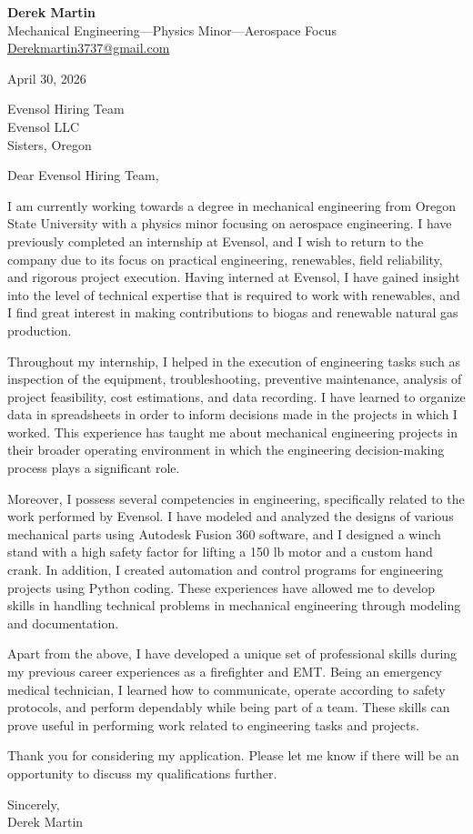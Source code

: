 \documentclass[11pt]{article}
\begin{document}
{\Large \textbf{Derek Martin}}\\
Mechanical Engineering---Physics Minor---Aerospace Focus\\
\href{mailto:Derekmartin3737@gmail.com}{Derekmartin3737@gmail.com}

\vspace{1.1em}

April 30, 2026

Evensol Hiring Team\\
Evensol LLC\\
Sisters, Oregon

\vspace{1.1em}

Dear Evensol Hiring Team,

I am currently working towards a degree in mechanical engineering from Oregon State University with a physics minor focusing on aerospace engineering. I have previously completed an internship at Evensol, and I wish to return to the company due to its focus on practical engineering, renewables, field reliability, and rigorous project execution. Having interned at Evensol, I have gained insight into the level of technical expertise that is required to work with renewables, and I find great interest in making contributions to biogas and renewable natural gas production.

Throughout my internship, I helped in the execution of engineering tasks such as inspection of the equipment, troubleshooting, preventive maintenance, analysis of project feasibility, cost estimations, and data recording. I have learned to organize data in spreadsheets in order to inform decisions made in the projects in which I worked. This experience has taught me about mechanical engineering projects in their broader operating environment in which the engineering decision-making process plays a significant role.

Moreover, I possess several competencies in engineering, specifically related to the work performed by Evensol. I have modeled and analyzed the designs of various mechanical parts using Autodesk Fusion 360 software, and I designed a winch stand with a high safety factor for lifting a 150 lb motor and a custom hand crank. In addition, I created automation and control programs for engineering projects using Python coding. These experiences have allowed me to develop skills in handling technical problems in mechanical engineering through modeling and documentation.

Apart from the above, I have developed a unique set of professional skills during my previous career experiences as a firefighter and EMT. Being an emergency medical technician, I learned how to communicate, operate according to safety protocols, and perform dependably while being part of a team. These skills can prove useful in performing work related to engineering tasks and projects.

Thank you for considering my application. Please let me know if there will be an opportunity to discuss my qualifications further.

\vspace{0.8em}

Sincerely,\\
Derek Martin
\end{document}
